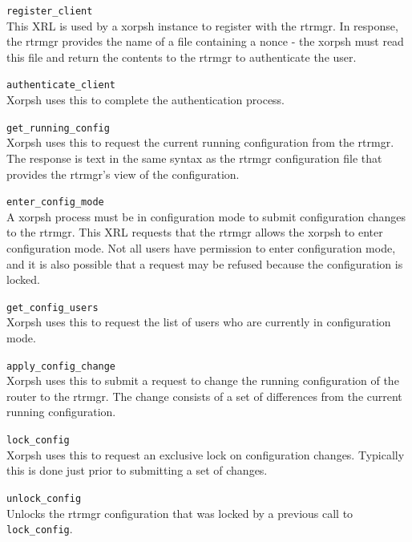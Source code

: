 \documentclass[11pt]{article}
\begin{document}
\begin{description}

  \item{\tt register\_client} \\This XRL is used by a xorpsh instance to
register with the rtrmgr.  In response, the rtrmgr provides the name
of a file containing a nonce - the xorpsh must read this file and
return the contents to the rtrmgr to authenticate the user.

  \item{\tt authenticate\_client} \\Xorpsh uses this to complete the
authentication process.

  \item{\tt get\_running\_config} \\Xorpsh uses this to request the
current running configuration from the rtrmgr.  The response is text
in the same syntax as the rtrmgr configuration file that provides the
rtrmgr's view of the configuration.

  \item{\tt enter\_config\_mode} \\A xorpsh process must be in
configuration mode to submit configuration changes to the rtrmgr.
This XRL requests that the rtrmgr allows the xorpsh to enter
configuration mode.  Not all users have permission to enter
configuration mode, and it is also possible that a request may be
refused because the configuration is locked.

  \item{\tt get\_config\_users} \\Xorpsh uses this to request the list of
users who are currently in configuration mode.

  \item{\tt apply\_config\_change} \\Xorpsh uses this to submit a request
to change the running configuration of the router to the rtrmgr.  The
change consists of a set of differences from the current running
configuration.

  \item{\tt lock\_config} \\Xorpsh uses this to request an exclusive
lock on configuration changes.  Typically this is done just prior to
submitting a set of changes.

  \item{\tt unlock\_config} \\Unlocks the rtrmgr configuration that was
locked by a previous call to {\tt lock\_config}.


\end{description}
\end{document}

